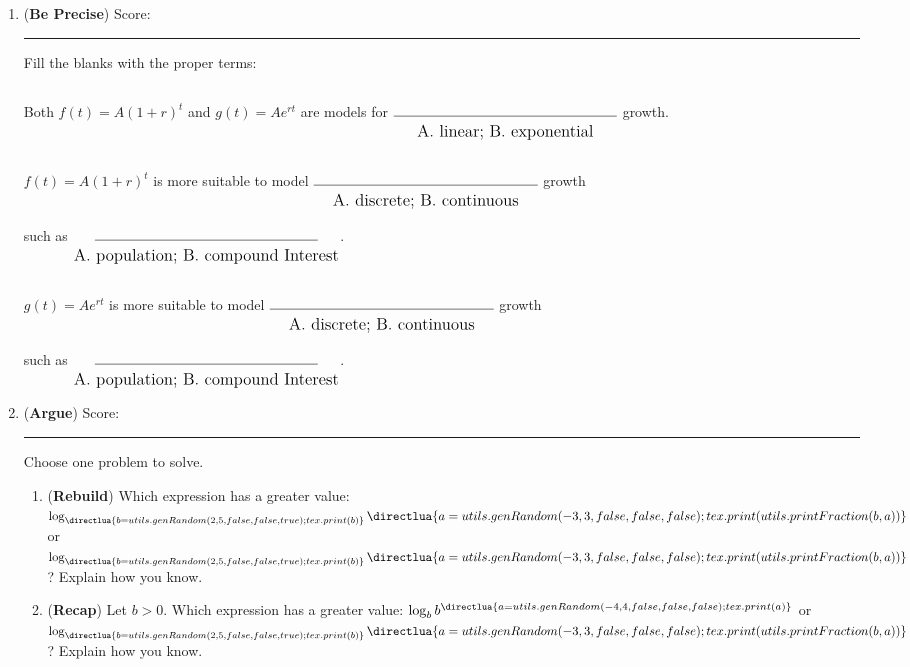\begin{enumerate}
\item (\textbf{Be Precise}) Score: \rule{2em}{.4pt} 

Fill the blanks with the proper terms:

Both $f(t) = A(1 + r)^t$ and $g(t) = Ae^{rt}$ are models for $\substack{\rule[-5ex]{16em}{.4pt}\\[.5em] \text{\large A. linear; B. exponential}}$ growth.

$f(t) = A(1 + r)^t$ is more suitable to model  $\substack{\rule[-5ex]{16em}{.4pt}\\[.5em] \text{\large A. discrete; B. continuous}}$ growth\\ such as  $\substack{\rule[-5ex]{16em}{.4pt}\\[.5em] \text{\large A. population; B. compound Interest}}$.

$g(t) = Ae^{rt}$ is more suitable to model $\substack{\rule[-5ex]{16em}{.4pt}\\[.5em] \text{\large A. discrete; B. continuous}}$ growth\\ such as $\substack{\rule[-5ex]{16em}{.4pt}\\[.5em] \text{\large A. population; B. compound Interest}}$.

\item ({\textbf{Argue}}) Score: \rule{2em}{.4pt} 

Choose one problem to solve.
\begin{enumerate}
\item
(\textbf{Rebuild}) Which expression has a greater value: $\log_{\directlua{b = utils.genRandom(2,5,false,false,true);tex.print(b)}}\directlua{a=utils.genRandom(-3,3, false, false,false);tex.print(utils.printFraction(b,a))}$ or  $\log_{\directlua{b = utils.genRandom(2,5,false,false,true);tex.print(b)}}\directlua{a=utils.genRandom(-3,3, false, false,false);tex.print(utils.printFraction(b,a))}$? Explain how you know.
\item
(\textbf{Recap}) Let $b>0$. Which expression has a greater value: $\log_b b^{\directlua{a=utils.genRandom(-4,4, false, false,false);tex.print(a)}}$ or  $\log_{\directlua{b = utils.genRandom(2,5,false,false,true);tex.print(b)}}\directlua{a=utils.genRandom(-3,3, false, false,false);tex.print(utils.printFraction(b,a))}$? Explain how you know.
\end{enumerate}
\clearpage


\end{enumerate}
